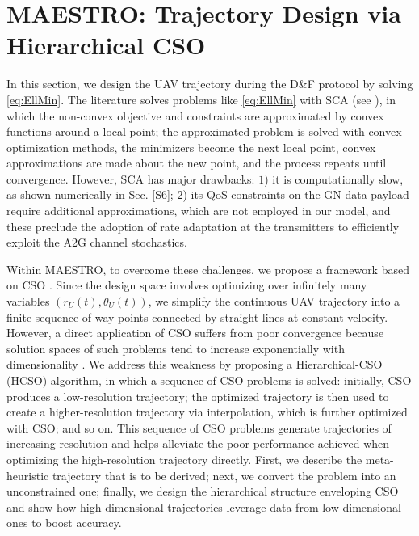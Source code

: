 \documentclass[12pt, draftcls, onecolumn]{IEEEtran}
\theoremstyle{plain}
\theoremstyle{definition}
\theoremstyle{remark}
\begin{document}
\section{MAESTRO: Trajectory Design via Hierarchical CSO}\label{S4}
\vspace{-2mm}

In this section, we design the UAV trajectory during the D\&F protocol by solving \eqref{eq:EllMin}. The literature solves problems like \eqref{eq:EllMin} with SCA (see \cite{SCA, CSCA-ADMM, EnergyEfficientUAVs}), in which the non-convex objective and constraints are approximated by convex functions around a local point; the approximated problem is solved with convex optimization methods, the minimizers become the next local point, convex approximations are made about the new point, and the process repeats until convergence. However, SCA has major drawbacks: $1$) it is computationally slow, as shown numerically in Sec. \ref{S6}; $2$) its QoS constraints on the GN data payload require additional approximations, which are not employed in our model, and these preclude the adoption of rate adaptation at the transmitters to efficiently exploit the A2G channel stochastics.

Within MAESTRO, to overcome these challenges, we propose a framework based on CSO \cite{CSO}. Since the design space involves optimizing over infinitely many variables $(r_{U}(t),\theta_{U}(t))$, we simplify the continuous UAV trajectory into a finite sequence of way-points connected by straight lines at constant velocity. However, a direct application of CSO suffers from poor convergence because solution spaces of such problems tend to increase exponentially with dimensionality \cite{HighDimensionality}. We address this weakness by proposing a Hierarchical-CSO (HCSO) algorithm, in which a sequence of CSO problems is solved: initially, CSO produces a low-resolution trajectory; the optimized trajectory is then used to create a higher-resolution trajectory via interpolation, which is further optimized with CSO; and so on. This sequence of CSO problems generate trajectories of increasing resolution and helps alleviate the poor performance achieved when optimizing the high-resolution trajectory directly. First, we describe the meta-heuristic trajectory that is to be derived; next, we convert the problem into an unconstrained one; finally, we design the hierarchical structure enveloping CSO and show how high-dimensional trajectories leverage data from low-dimensional ones to boost accuracy.
\end{document}
